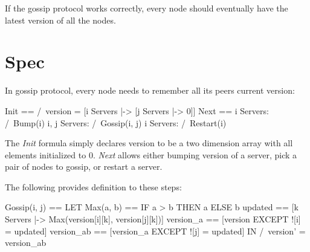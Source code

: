 If the gossip protocol works correctly, every node should eventually have the
latest version of all the nodes.

\section{Spec}

In gossip protocol, every node needs to remember all its peers current
version:\newline

\begin{tla}
Init ==
    /\ version = [i \in Servers |-> [j \in Servers |-> 0]]
Next ==
    \/ \E i \in Servers:
        /\ Bump(i)
    \/ \E i, j \in Servers:
        /\ Gossip(i, j)
    \/ \E i \in Servers:
        /\ Restart(i)
\end{tla}
\begin{tlatex}
%
%
%
%
%
%
%
%
\end{tlatex}
\newline

The \textit{Init} formula simply declares version to be a two dimension array
with all elements initialized to 0. \textit{Next} allows either bumping version
of a server, pick a pair of nodes to gossip, or restart a server.\newline

The following provides definition to these steps:\newline

\begin{tla}
Gossip(i, j) == 
    LET 
        Max(a, b) == IF a > b THEN a ELSE b
        updated == [k \in Servers |-> Max(version[i][k], version[j][k])]
        version_a == [version EXCEPT ![i] = updated]
        version_ab == [version_a EXCEPT ![j] = updated]
    IN 
        /\ version' = version_ab 
\end{tla}
\begin{tlatex}
%
%
%
%
\end{tlatex}
\newline

